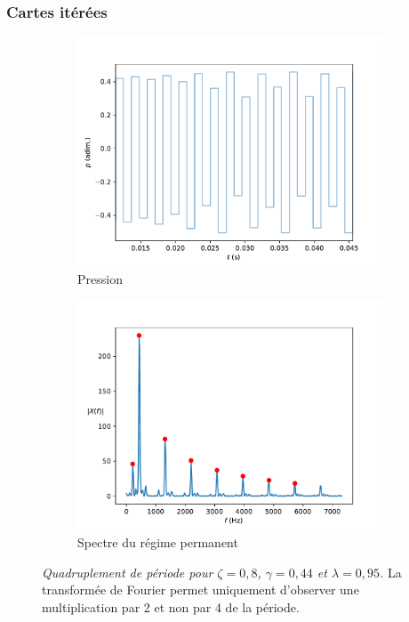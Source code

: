 \subsubsection{Cartes itérées}

\begin{figure}[h!]
    \centering
    \begin{subfigure}[b]{.8\linewidth}
        \includegraphics[width=\linewidth]{img/doublement_periode_pressure.pdf}
        \caption{Pression}
        \label{fig:pression doublement periode}
    \end{subfigure}
    \begin{subfigure}[b]{.8\linewidth}
        \includegraphics[width=\linewidth]{img/doublement_periode_spectre.pdf}
        \caption{Spectre du régime permanent}
        \label{fig:spectre doublement periode}
    \end{subfigure}
    \caption{\emph{Quadruplement de période pour $\zeta=0,8$, $\gamma=0,44$ et $\lambda = 0,95$.} La transformée de Fourier permet uniquement d'observer une multiplication par 2 et non par 4 de la période.}
    \label{fig:doublement periode}
\end{figure}
